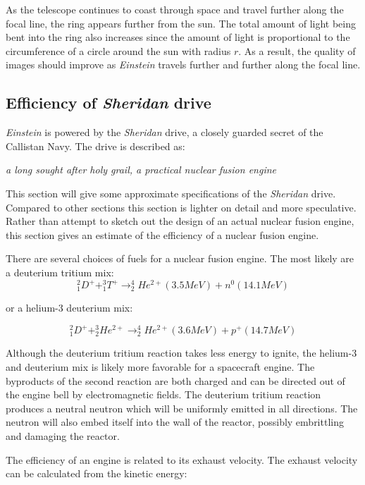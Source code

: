 \documentclass[12pt]{article} %
\begin{document}
As the telescope continues to coast through space and travel further along the focal line, the  ring appears further from the sun. The total amount of light being bent into the ring also increases since the amount of light is proportional to the circumference of a circle around the sun with radius $r$. As a result, the quality of images should improve as \textit{Einstein} travels further and further along the focal line.

\newpage
\subsection{Efficiency of \textit{Sheridan} drive}
\label{subsec:efficiency}
\textit{Einstein} is powered by the \textit{Sheridan} drive, a closely guarded secret of the Callistan Navy. The drive is described as:

\hspace{2cm} \textit{a long sought after holy grail, a practical nuclear fusion engine}

This section will give some approximate specifications of the \textit{Sheridan} drive. Compared to other sections this section is lighter on detail and more speculative. Rather than attempt to sketch out the design of an actual nuclear fusion engine, this section gives an estimate of the efficiency of a nuclear fusion engine.

There are several choices of fuels for a nuclear fusion engine. The most likely are a deuterium tritium mix:
$$^2_1D^+ + ^3_1T^+ \rightarrow ^4_2He^{2+} (3.5 MeV) + n^0 (14.1 MeV)$$

or a helium-3 deuterium mix:

$$^2_1D^+ + ^3_2He^{2+} \rightarrow ^4_2He^{2+} (3.6 MeV) + p^+ (14.7 MeV)$$

Although the deuterium tritium reaction takes less energy to ignite, the helium-3 and deuterium mix is likely more favorable for a spacecraft engine. The byproducts of the second reaction are both charged and can be directed out of the engine bell by electromagnetic fields. The deuterium tritium reaction produces a neutral neutron which will be uniformly emitted in all directions. The neutron will also embed itself into the wall of the reactor, possibly embrittling and damaging the reactor.

The efficiency of an engine is related to its exhaust velocity. The exhaust velocity can be calculated from the kinetic energy:
\end{document}
